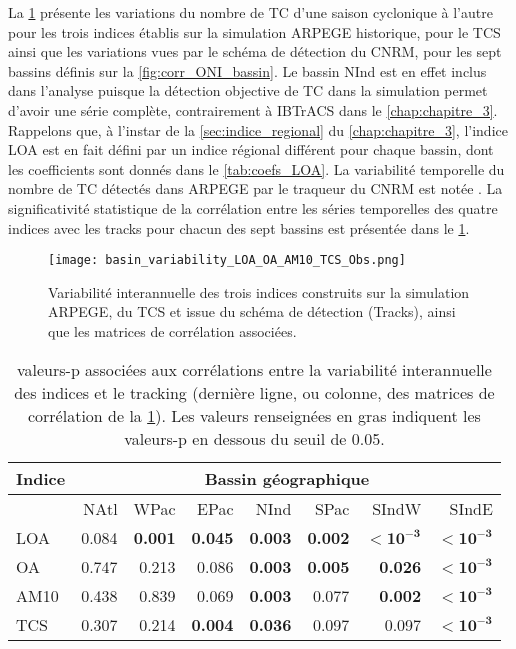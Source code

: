 \documentclass[../main.tex]{subfiles}
\begin{document}
La \cref{fig:variability_ONI} présente les variations du nombre de TC d'une saison cyclonique à l'autre pour les trois indices établis sur la simulation ARPEGE
historique, pour le TCS ainsi que les variations vues par le schéma de détection du CNRM, pour les sept bassins définis sur la \cref{fig:corr_ONI_bassin}. Le
bassin NInd est en effet inclus dans l'analyse puisque la détection objective de TC dans la simulation permet d'avoir une série complète, contrairement à
IBTrACS dans le \cref{chap:chapitre_3}. Rappelons que, à l'instar de la \cref{sec:indice_regional} du \cref{chap:chapitre_3}, l'indice LOA est en fait défini
par un indice régional différent pour chaque bassin, dont les coefficients sont donnés dans le \cref{tab:coefs_LOA}. La variabilité temporelle du nombre de TC
détectés dans ARPEGE par le traqueur du CNRM est notée . La significativité statistique de la corrélation entre les séries temporelles des
quatre indices avec les tracks pour chacun des sept bassins est présentée dans le \cref{tab:pvalues_ONI}.

\begin{figure}[p]
    \centering
    \texttt{[image: basin\_variability\_LOA\_OA\_AM10\_TCS\_Obs.png]}
    \caption{Variabilité interannuelle des trois indices construits sur la simulation ARPEGE, du TCS et issue du schéma de détection (Tracks), ainsi que les
    matrices de corrélation associées.}
    \label{fig:variability_ONI}
\end{figure}

\begin{table}[htpb]
    \centering
    \caption{valeurs-p associées aux corrélations entre la variabilité interannuelle des indices et le tracking (dernière ligne, ou colonne, des matrices de
    corrélation de la \cref{fig:variability_ONI}). Les valeurs renseignées en gras indiquent les valeurs-p en dessous du seuil de \num{0.05}.}
    \label{tab:pvalues_ONI}
    \begin{tabular}{lrrrrrrr}
        \toprule\toprule
        \multicolumn{1}{c}{Indice} & \multicolumn{7}{c}{Bassin géographique}\\
        \midrule
                                   & NAtl & WPac & EPac & NInd & SPac & SIndW & SIndE \\
        \midrule
        LOA  & \num{0.084} & \textbf{\num{0.001}} & \textbf{\num{0.045}} & \textbf{\num{0.003}} & \textbf{\num{0.002}} & $\mathbf{< 10^{-3}}$ & $\mathbf{< 10^{-3}}$ \\
        OA   & \num{0.747} & \num{0.213} & \num{0.086} & \textbf{\num{0.003}} & \textbf{\num{0.005}} & \textbf{\num{0.026}} & $\mathbf{< 10^{-3}}$ \\
        AM10 & \num{0.438} & \num{0.839} & \num{0.069} & \textbf{\num{0.003}} & \num{0.077} & \textbf{\num{0.002}} & $\mathbf{< 10^{-3}}$ \\
        TCS  & \num{0.307} & \num{0.214} & \textbf{\num{0.004}} & \textbf{\num{0.036}} & \num{0.097} & \num{0.097} & $\mathbf{< 10^{-3}}$ \\
        \bottomrule
    \end{tabular}
\end{table}
\end{document}
